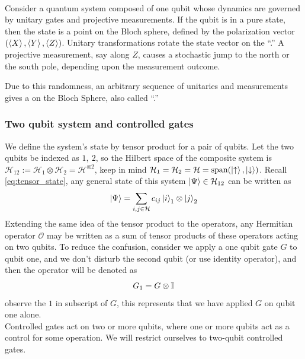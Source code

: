 \documentclass[11pt, oneside, listof=totoc]{scrbook}
\renewcommand{\H}{\mathcal{H}}
\renewcommand{\O}{\mathcal{O}}
\newcommand{\ku}{\ket{\uparrow}}
\newcommand{\kd}{\ket{\downarrow}}
\begin{document}
\\
Consider a quantum system composed of one qubit whose dynamics are governed by unitary gates and projective measurements. If the qubit is in a pure state, then the state is a point on the Bloch sphere, defined by the polarization vector $(\expval{X}, \expval{Y}, \expval{Z})$. Unitary transformations rotate the state vector on the ``.'' A projective measurement, say along \(Z\), causes a stochastic jump to the north or the south pole, depending upon the measurement outcome.

Due to this randomness, an arbitrary sequence of unitaries and measurements gives a  on the Bloch Sphere, also called ``.''

\subsubsection{Two qubit system and controlled gates}

We define the system's state by tensor product for a pair of qubits. Let the two qubits be indexed as \(1, ~2\), so the Hilbert space of the composite system is \(\H_{12} := \H_1 \otimes \H_2 = \H^{\otimes 2}\), keep in mind \(\H_1 = \H_2 = \H = \Span(\ku, \kd)\). Recall \cref{eq:tensor_state}, any general state of this system \(\ket{\Psi} \in \H_{12}\) can be written as
\[
    \ket{\Psi} = \sum_{i, j \in \H} c_{i j} \ket{i}_1 \otimes \ket{j}_2
\]
Extending the same idea of the tensor product to the operators, any Hermitian operator \(\O\) may be written as a sum of tensor products of these operators acting on two qubits. To reduce the confusion, consider we apply a one qubit gate \(G\) to qubit one, and we don't disturb the second qubit (or use identity operator), and then the operator will be denoted as
\[
    G_1 = G \otimes \mathbb{I}_{}
\]
observe the \(1\) in subscript of \(G\), this represents that we have applied \(G\) on qubit one alone.\\

 Controlled gates act on two or more qubits, where one or more qubits act as a control for some operation. We will restrict ourselves to two-qubit controlled gates.
\end{document}

